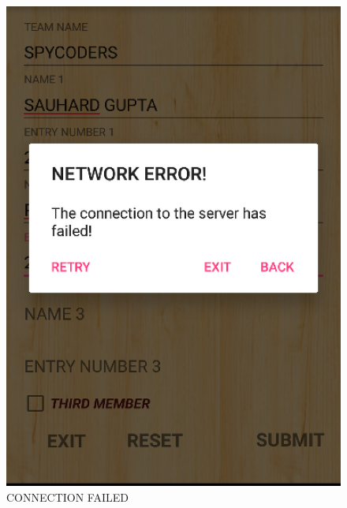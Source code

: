 \documentclass[12pt]{article}
\begin{document}
\begin{itemize}
\begin{figure}
	\includegraphics[scale=.7]{CONNECTION_FAILED.png}
	\caption{CONNECTION FAILED}
\end{figure}
\begin{figure}
	\centering

\end{figure}
\end{itemize}
\end{document}
